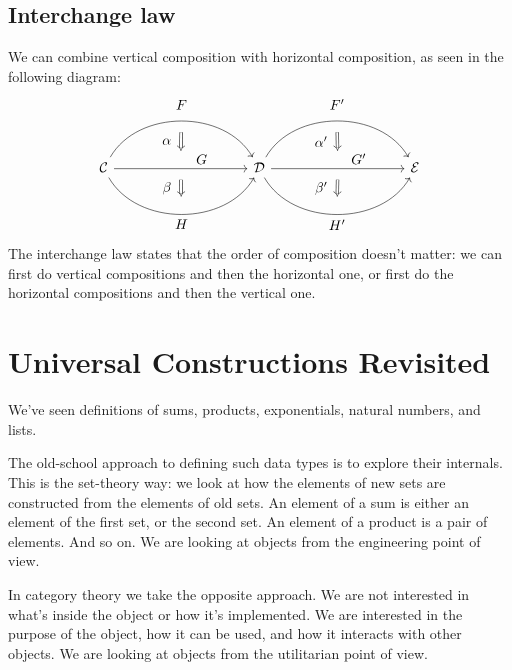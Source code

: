 \documentclass[DaoFP]{subfiles}
\begin{document}
\subsection{Interchange law}
We can combine vertical composition with horizontal composition, as seen in the following diagram:
\[
\begin{tikzcd}[column sep=huge]
\mathcal{C}
  \arrow[bend left=60]{rr}[name=U, label=above:$F$]{}
  \arrow[]{rr}[name=M, label={[xshift=15pt, yshift=-5pt]:$G$}]{} 
  \arrow[bend right=60]{rr}[name=D, label=below:$H$]{} 
 &&
\mathcal{D}
  \arrow[bend left=60]{rr}[name=U1, label=above:$F'$]{}
  \arrow[]{rr}[name=M1, label={[xshift=15pt, yshift=-5pt]:$G'$}]{} 
  \arrow[bend right=60]{rr}[name=D1, label=below:$H'$]{} 
&&
\mathcal{E}
  \arrow[shorten <=8pt, shorten >=8pt,Rightarrow, to path={(U) -- node[label=left:$\alpha$] {} (M)}]{}
  \arrow[shorten <=8pt, shorten >=8pt,Rightarrow, to path={(M) -- node[label=left:$\beta$] {} (D)}]{}
  \arrow[shorten <=8pt, shorten >=8pt,Rightarrow, to path={(U1) -- node[label=left:$\alpha'$] {} (M1)}]{}
  \arrow[shorten <=8pt, shorten >=8pt,Rightarrow, to path={(M1) -- node[label=left:$\beta'$] {} (D1)}]{}
\end{tikzcd}
\]
The interchange law states that the order of composition doesn't matter: we can first do vertical compositions and then the horizontal one, or first do the horizontal compositions and then the vertical one.

\section{Universal Constructions Revisited}

We've seen definitions of sums, products, exponentials, natural numbers, and lists. 

The old-school approach to defining such data types is to explore their internals. This is the set-theory way: we look at how the elements of new sets are constructed from the elements of old sets. An element of a sum is either an element of the first set, or the second set. An element of a product is a pair of elements. And so on. We are looking at objects from the engineering point of view.

In category theory we take the opposite approach. We are not interested in what's inside the object or how it's implemented. We are interested in the purpose of the object, how it can be used, and how it interacts with other objects. We are looking at objects from the utilitarian point of view.
\end{document}

